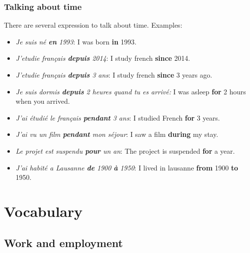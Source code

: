 \documentclass[palatino]{nicenotes}
\begin{document}
\subsection{Talking about time}

There are several expression to talk about time. Examples:

\begin{itemize}
\item \textit{Je suis né \textbf{en} 1993}: I was born \textbf{in} 1993.
\item \textit{J'etudie français \textbf{depuis} 2014}: I study french \textbf{since} 2014.
\item \textit{J'etudie français \textbf{depuis} 3 ans}: I study french \textbf{since} 3 years ago.
\item \textit{Je suis dormis \textbf{depuis} 2 heures quand tu es arrivé:} I was asleep \textbf{for} 2 hours when you arrived.
\item \textit{J'ai étudié le français \textbf{pendant} 3 ans}: I studied French \textbf{for} 3 years.
\item \textit{J'ai vu un film \textbf{pendant} mon séjour}: I saw a film \textbf{during} my stay.
\item \textit{Le projet est suspendu \textbf{pour} un an}: The project is suspended \textbf{for} a year.
\item \textit{J'ai habité a Lausanne \textbf{de} 1900 \textbf{à} 1950}: I lived in lausanne \textbf{from} 1900 \textbf{to} 1950.
\end{itemize}

\chapter{Vocabulary}

\section{Work and employment}
\end{document}

